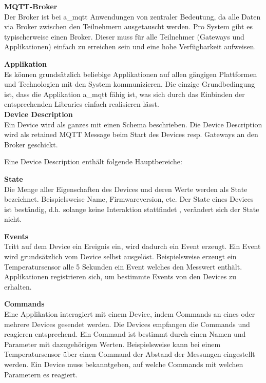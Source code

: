 \textbf{MQTT-Broker} \\
Der Broker ist bei \acrshort{a_mqtt} Anwendungen von zentraler Bedeutung, da alle Daten via Broker zwischen den Teilnehmern ausgetauscht werden. Pro System gibt es typischerweise einen Broker. Dieser muss für alle Teilnehmer (Gateways und Applikationen) einfach zu erreichen sein und eine hohe Verfügbarkeit aufweisen.

\textbf{Applikation} \\
Es können grundsätzlich beliebige Applikationen auf allen gängigen Plattformen und Technologien mit den System kommunizieren. Die einzige Grundbedingung ist, dass die Applikation \acrshort{a_mqtt} fähig ist, was sich durch das Einbinden der entsprechenden Libraries einfach realisieren lässt.
\\


\textbf{Device Description} \\
Ein Device wird als ganzes mit einen Schema beschrieben. Die Device Description wird als retained MQTT Message beim Start des Devices resp. Gateways an den Broker geschickt.

Eine Device Description enthält folgende Hauptbereiche:

\textbf{State} \\
Die Menge aller Eigenschaften des Devices und deren Werte werden als State bezeichnet. Beispielsweise Name, Firmwareversion, etc. Der State eines Devices ist beständig, d.h. solange keine Interaktion stattfindet , verändert sich der State nicht.


\textbf{Events} \\
Tritt auf dem Device ein Ereignis ein, wird dadurch ein Event erzeugt. Ein Event wird grundsätzlich vom Device selbst ausgelöst. Beispielsweise erzeugt ein Temperatursensor alle 5 Sekunden ein Event welches den Messwert enthält. Applikationen registrieren sich, um bestimmte Events von den Devices zu erhalten.


\textbf{Commands} \\
Eine Applikation interagiert mit einem Device, indem Commands an eines oder mehrere Devices gesendet werden. Die Devices empfangen die Commands und reagieren entsprechend. Ein Command ist bestimmt durch einen Namen und Parameter mit dazugehörigen Werten. 
Beispielsweise kann bei einem Temperatursensor über einen Command  der Abstand der Messungen eingestellt werden.
Ein Device muss bekanntgeben, auf welche Commands mit welchen Parametern es reagiert.


